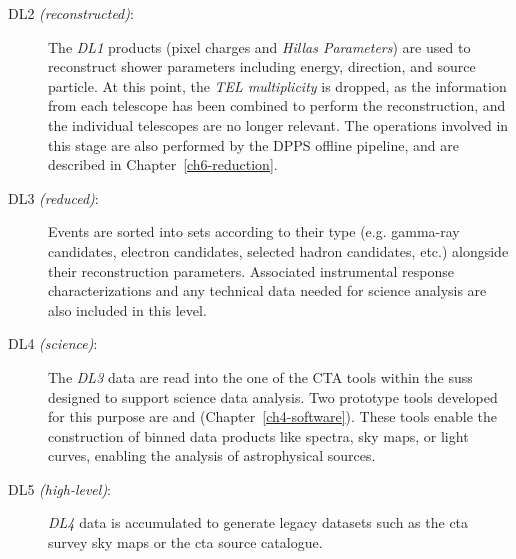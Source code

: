 \begin{description}
\item[DL2 \textit{(reconstructed)}:]
The \textit{DL1} products (pixel charges and \textit{Hillas Parameters}) are used to reconstruct shower parameters including energy, direction, and source particle. At this point, the \textit{TEL multiplicity} is dropped, as the information from each telescope has been combined to perform the reconstruction, and the individual telescopes are no longer relevant. The operations involved in this stage are also performed by the DPPS offline pipeline, and are described in Chapter~\ref{ch6-reduction}.
\item[DL3 \textit{(reduced)}:]
Events are sorted into sets according to their type (e.g. gamma-ray candidates, electron candidates, selected hadron
candidates, etc.) alongside their reconstruction parameters. Associated instrumental response characterizations and any technical data needed for
science analysis are also included in this level.
\item[DL4 \textit{(science)}:]
The \textit{DL3} data are read into the one of the CTA tools within the \gls{suss} designed to support science data analysis. Two prototype tools developed for this purpose are  and  (Chapter~\ref{ch4-software}). These tools enable the construction of binned data products like spectra, sky maps, or light curves, enabling the analysis of astrophysical sources.
\item[DL5 \textit{(high-level)}:]
\textit{DL4} data is accumulated to generate legacy datasets such as the \gls{cta} survey sky maps or the \gls{cta} source catalogue.
\end{description}